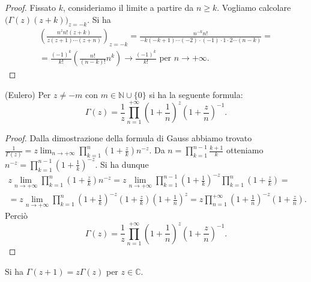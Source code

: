 \begin{proof}
  Fissato $k$, consideriamo il limite a partire da $n \ge k$. Vogliamo calcolare $\big(\Gamma(z)(z+k)\big)_{z=-k}$. Si ha
  \begin{gather*}
    \left(\frac{n^zn!(z+k)}{z(z+1)\cdots(z+n)}\right)_{z=-k}=\frac{n^{-k}n!}{-k(-k+1)\cdots(-2)\cdot(-1)\cdot1\cdot2\cdots(n-k)}= \\
    =\frac{(-1)^k}{k!}\left(\frac{n!}{(n-k)!}n^k\right) \longrightarrow \frac{(-1)^k}{k!} \text{ per } n \longrightarrow +\infty.
  \end{gather*}
\end{proof}

\begin{prop} \label{eulgamma}
  (Eulero) Per $z \not=-m$ con $m \in \mathbb{N}\cup\{0\}$ si ha la seguente formula:
  \begin{equation}
    \Gamma(z)=\frac{1}{z}\prod_{n=1}^{+\infty}\left(1+\frac{1}{n}\right)^z\left(1+\frac{z}{n}\right)^{-1}.
  \end{equation}
\end{prop}

\begin{proof}
  Dalla dimostrazione della formula di Gauss abbiamo trovato $\displaystyle \frac{1}{\Gamma(z)}=z\lim_{n \longrightarrow +\infty}\prod_{k=1}^n\left(1+\frac{z}{k}\right)n^{-z}$. Da $\displaystyle n=\prod_{k=1}^{n-1} \frac{k+1}{k}$ otteniamo $\displaystyle n^{-z}=\prod_{k=1}^{n-1}\left(1+\frac{1}{k}\right)^{-z}$. Si ha dunque
  \begin{gather*}
    z\lim_{n \longrightarrow +\infty}\prod_{k=1}^n\left(1+\frac{z}{k}\right)n^{-z}=z\lim_{n \longrightarrow +\infty} \prod_{k=1}^{n-1}\left(1+\frac{1}{k}\right)^{-z}\prod_{k=1}^n\left(1+\frac{z}{k}\right)=\\
    =z\lim_{n \longrightarrow +\infty} \prod_{k=1}^n \left(1+\frac{1}{k}\right)^{-z}\left(1+\frac{z}{k}\right)\left(1+\frac{1}{n}\right)^z=z\prod_{n=1}^{+\infty} \left(1+\frac{1}{n}\right)^{-z}\left(1+\frac{z}{n}\right).
  \end{gather*}
  Perciò
  $$\Gamma(z)=\frac{1}{z}\prod_{n=1}^{+\infty} \left(1+\frac{1}{n}\right)^z\left(1+\frac{z}{n}\right)^{-1}.$$
\end{proof}

\begin{prop} \label{fatt}
  Si ha $\Gamma(z+1)=z\Gamma(z)$ per $z \in \mathbb{C}$.
\end{prop}


